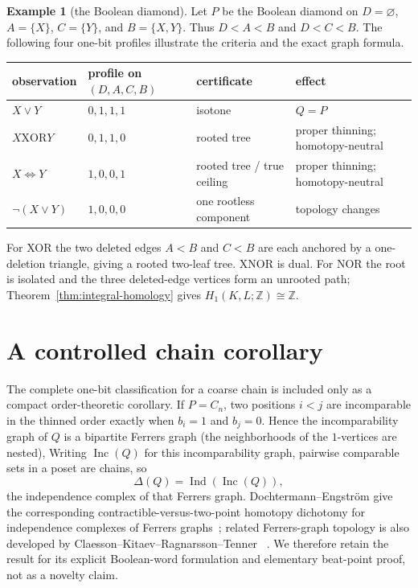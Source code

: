 \documentclass[11pt]{article}
\theoremstyle{definition}
\newtheorem{example}[theorem]{Example}
\theoremstyle{remark}
\newcommand{\Z}{\mathbb Z}
\newcommand{\D}{\Delta}
\begin{document}
\begin{example}[the Boolean diamond]\label{ex:diamond}
Let $P$ be the Boolean diamond on
$D=\varnothing$, $A=\{X\}$, $C=\{Y\}$, and $B=\{X,Y\}$.  Thus
$D<A<B$ and $D<C<B$.  The following four one-bit profiles illustrate the criteria and
the exact graph formula.
\begin{center}
\begin{tabular}{@{}ll>{\raggedright\arraybackslash}p{}>{\raggedright\arraybackslash}p{}@{}}
\toprule
observation & profile on $(D,A,C,B)$ & certificate & effect \\
\midrule
$X\vee Y$ & $0,1,1,1$ & isotone & $Q=P$ \\
$X\mathbin{\mathrm{XOR}}Y$ & $0,1,1,0$ & rooted tree & proper thinning; homotopy-neutral \\
$X\Leftrightarrow Y$ & $1,0,0,1$ & rooted tree / true ceiling & proper thinning; homotopy-neutral \\
$\neg(X\vee Y)$ & $1,0,0,0$ & one rootless component & topology changes \\
\bottomrule
\end{tabular}
\end{center}
For XOR the two deleted edges $A<B$ and $C<B$ are each anchored by a one-deletion
triangle, giving a rooted two-leaf tree.  XNOR is dual.  For NOR the root is isolated
and the three deleted-edge vertices form an unrooted path; Theorem~\ref{thm:integral-homology}
gives $H_1(K,L;\Z)\cong\Z$.
\end{example}

\section{A controlled chain corollary}\label{sec:chains}

The complete one-bit classification for a coarse chain is included only as a compact
order-theoretic corollary.  If $P=C_n$, two positions $i<j$ are incomparable in the
thinned order exactly when $b_i=1$ and $b_j=0$.  Hence the incomparability graph of
$Q$ is a bipartite Ferrers graph (the neighborhoods of the $1$-vertices are nested),
Writing $\operatorname{Inc}(Q)$ for this incomparability graph, pairwise comparable
sets in a poset are chains, so
\[
  \D(Q)=\operatorname{Ind}(\operatorname{Inc}(Q)),
\]
the independence complex of that Ferrers graph.  Dochtermann--Engstr\"om give the
corresponding contractible-versus-two-point homotopy dichotomy for independence
complexes of Ferrers graphs~\cite[Proposition~3.7]{DochtermannEngstrom2009}; related
Ferrers-graph topology is also developed by Claesson--Kitaev--Ragnarsson--Tenner
~\cite{ClaessonKitaevRagnarssonTenner2010}.  We therefore retain the result for its
explicit Boolean-word formulation and elementary beat-point proof, not as a novelty
claim.
\end{document}
